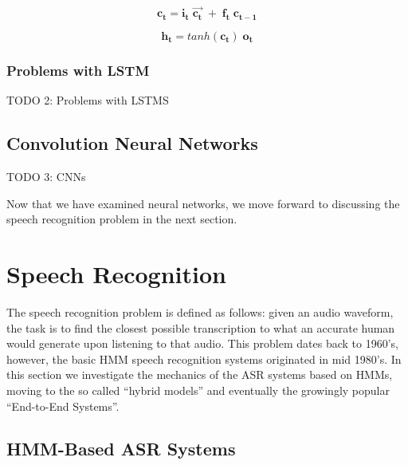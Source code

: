 



\begin{equation}
\label{eq:11}
\mathbf{c_t} = \mathbf{i_t } \; \mathbf{\vec{c_t}} \; + \;  \mathbf{f_t} \; \mathbf{c_{t-1}}
\end{equation}

\begin{equation}
\label{eq:12}
\mathbf{h_t} = tanh(\mathbf{c_t}) \; \mathbf{o_t}
\end{equation}




\subsubsection{Problems with \ac{LSTM}}
\label{conc:subsub7}
TODO 2: Problems with LSTMS

\subsection{Convolution Neural Networks} 
\label{bg:sub3}
TODO 3: CNNs






Now that we have examined neural networks, we move forward to discussing the speech recognition problem in the next section.

\section{Speech Recognition} \label{bg:s3}

The speech recognition problem is defined as follows: given an audio waveform, the task is to find the closest possible transcription to what an accurate human would generate upon listening to that audio. This problem dates back to 1960's, however, the basic \ac{HMM} speech recognition systems originated in mid 1980's. In this section we investigate the mechanics of the \ac{ASR} systems based on \ac{HMM}s, moving to the so called \enquote{hybrid models} and eventually the growingly popular \enquote{End-to-End Systems}.

\subsection{HMM-Based \ac{ASR} Systems} 
\label{bg:sub4}


